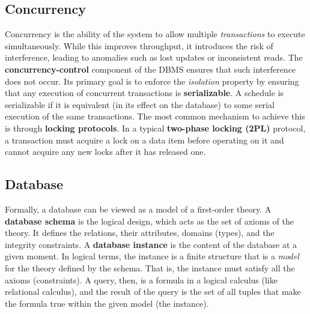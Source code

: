 \subsection{Concurrency} %
Concurrency is the ability of the system to allow multiple \textit{transactions} to execute simultaneously. While this improves throughput, it introduces the risk of interference, leading to anomalies such as lost updates or inconsistent reads. The \textbf{concurrency-control} component of the DBMS ensures that such interference does not occur. Its primary goal is to enforce the \textit{isolation} property by ensuring that any execution of concurrent transactions is \textbf{serializable}. A schedule is serializable if it is equivalent (in its effect on the database) to some serial execution of the same transactions. The most common mechanism to achieve this is through \textbf{locking protocols}. In a typical \textbf{two-phase locking (2PL)} protocol, a transaction must acquire a lock on a data item before operating on it and cannot acquire any new locks after it has released one.

\subsection{Database}
Formally, a database can be viewed as a model of a first-order theory. A \textbf{database schema} is the logical design, which acts as the set of axioms of the theory. It defines the relations, their attributes, domains (types), and the integrity constraints. A \textbf{database instance} is the content of the database at a given moment. In logical terms, the instance is a finite structure that is a \textit{model} for the theory defined by the schema. That is, the instance must satisfy all the axioms (constraints). A query, then, is a formula in a logical calculus (like relational calculus), and the result of the query is the set of all tuples that make the formula true within the given model (the instance).

